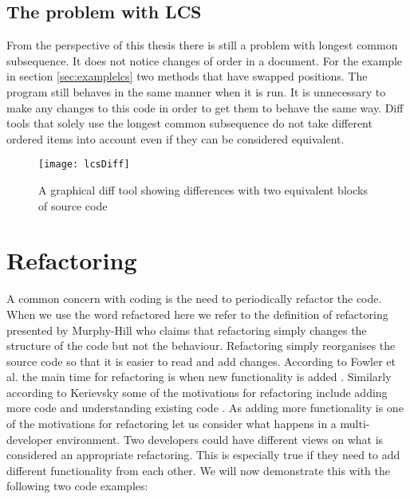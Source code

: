 
\subsection{The problem with LCS}
From the perspective of this thesis there is still a problem with longest common subsequence. 
It does not notice changes of order in a document.  
For the example in section \ref{sec:examplelcs} two methods that have swapped positions.
The program still behaves in the same manner when it is run.
It is unnecessary to make any changes to this code in order to get them to behave the same way.
Diff tools that solely use the longest common subsequence do not take different ordered items into account even if they can be considered equivalent.

\begin{figure}[h]
\begin{center}
\texttt{[image: lcsDiff]}
\end{center}
 \caption{A graphical diff tool showing differences with two equivalent blocks of source code}
\end{figure}


 

\section{Refactoring}
A common concern with coding is the need to periodically refactor the code. 
When we use the word refactored here we refer to the definition of refactoring presented by Murphy-Hill \cite{Murphy-Hill2008} who claims that refactoring simply changes the structure of the code but not the behaviour.
Refactoring simply reorganises the source code so that it is easier to read and add changes. 
According to Fowler et al. the main time for refactoring is when new functionality is added \cite{Fowler1999}. 
Similarly according to Kerievsky some of the motivations for refactoring include adding more code and understanding existing code \cite{Kerievsky2004}.
As adding more functionality is one of the motivations for refactoring let us consider what happens in a multi-developer environment. 
Two developers could have different views on what is considered an appropriate refactoring. 
This is especially true if they need to add different functionality from each other. 
We will now demonstrate this with the following two code examples:

